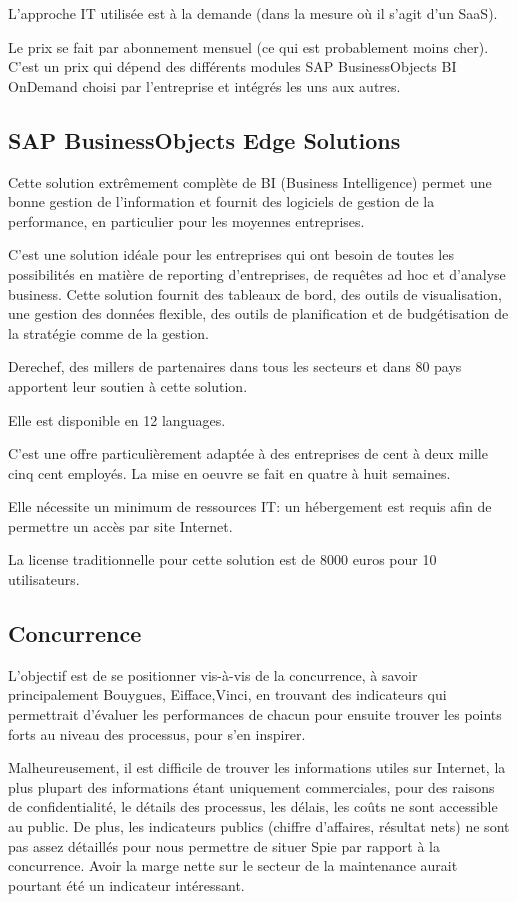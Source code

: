 L’approche IT utilisée est à la demande (dans la mesure où il  s'agit d’un SaaS).

Le prix se fait par abonnement mensuel (ce qui est probablement moins cher). C’est un prix qui dépend des différents modules SAP BusinessObjects BI OnDemand choisi par l’entreprise et intégrés les uns aux autres.

\subsection{SAP BusinessObjects Edge Solutions}

Cette solution extrêmement complète de BI (Business Intelligence) permet une bonne gestion de l’information et fournit des logiciels de gestion de la performance, en particulier pour les moyennes entreprises.

C’est une solution idéale pour les entreprises qui ont besoin de toutes les possibilités en matière de reporting d’entreprises, de requêtes ad hoc et d’analyse business. Cette solution fournit des tableaux de bord, des outils de visualisation, une gestion des données flexible, des outils de planification et de budgétisation de la stratégie comme de la gestion.

Derechef, des millers de partenaires dans tous les secteurs et dans 80 pays apportent leur soutien à cette solution.

Elle est disponible en 12 languages.

C’est une offre particulièrement adaptée à des entreprises de cent à deux mille cinq cent employés. La mise en oeuvre se fait en quatre à huit semaines.

Elle nécessite un minimum de ressources IT: un hébergement est requis afin de permettre un accès par site Internet.

La license traditionnelle pour cette solution est de 8000 euros pour 10 utilisateurs.

\subsection{Concurrence}

L’objectif est de se positionner vis-à-vis de la concurrence, à savoir principalement Bouygues, Eifface,Vinci, en trouvant des indicateurs qui permettrait d’évaluer les performances de chacun pour ensuite trouver les points forts au niveau des processus, pour s’en inspirer.

Malheureusement, il est difficile de trouver les informations utiles sur Internet, la plus plupart des informations étant uniquement commerciales, pour des raisons de confidentialité, le détails des processus, les délais, les coûts ne sont accessible au public. De plus, les indicateurs publics (chiffre d’affaires, résultat nets) ne sont pas assez détaillés pour nous permettre de situer Spie par rapport à la concurrence. Avoir la marge nette sur le secteur de la maintenance aurait pourtant été un indicateur intéressant.

